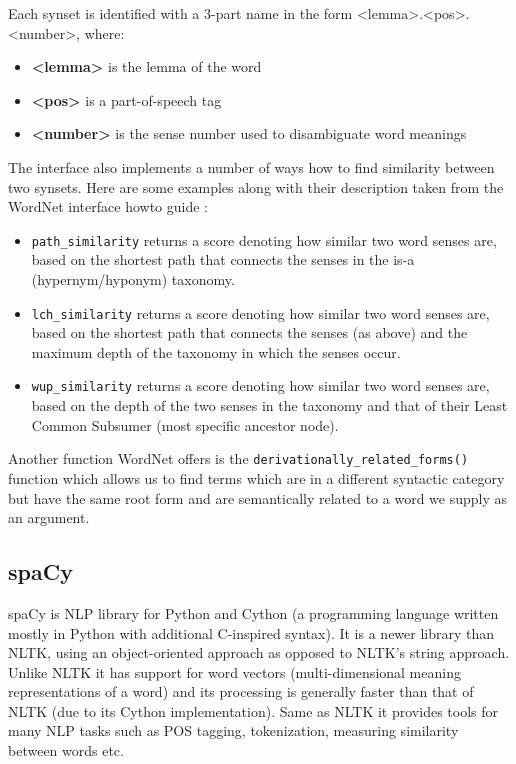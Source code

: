 Each synset is identified with a 3-part name in the form <lemma>.<pos>.<number>, where:
\begin{itemize}
\item \textbf{<lemma>} is the lemma of the word
\item \textbf{<pos>} is a part-of-speech tag
\item \textbf{<number>} is the sense number used to disambiguate word meanings \cite{nltk_docs}
\end{itemize}

The interface also implements a number of ways how to find similarity between two synsets. Here are some examples along with their description taken from the WordNet interface howto guide \cite{wordnet_howto}: 

\begin{itemize}
\item \texttt{path\_similarity} returns a score denoting how similar two word senses are, based on the shortest path that connects the senses in the is-a (hypernym/hyponym) taxonomy.

\item \texttt{lch\_similarity} returns a score denoting how similar two word senses are, based on the shortest path that connects the senses (as above) and the maximum depth of the taxonomy in which the senses occur.

\item \texttt{wup\_similarity} returns a score denoting how similar two word senses are, based on the depth of the two senses in the taxonomy and that of their Least Common Subsumer (most specific ancestor node). 
\end{itemize}

Another function WordNet offers is the \texttt{derivationally\_related\_forms()} function which allows us to find terms which are in a different syntactic category but have the same root form and are semantically related to a word we supply as an argument.

\subsection{spaCy}
spaCy is NLP library for Python and Cython (a programming language written mostly in Python with additional C-inspired syntax). It is a newer library than NLTK, using an object-oriented approach as opposed to NLTK's string approach. Unlike NLTK  it has support for word vectors (multi-dimensional meaning representations of a word) and its processing is generally faster than that of NLTK (due to its Cython implementation). 
Same as NLTK it provides tools for many NLP tasks such as POS tagging, tokenization, measuring similarity between words etc. \cite{spacy}